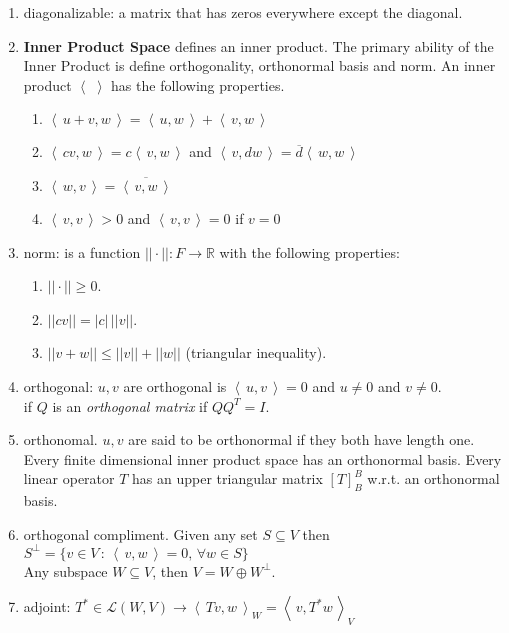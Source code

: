 \documentclass[11pt]{amsart}
\theoremstyle{definition}  %
\newcommand{\R}{\mathbb{R}}
\newcommand{\IP}[1]{\left \langle\, #1 \,\right \rangle}
\newcommand{\LL}{\mathcal{L}}
\begin{document}
\begin{enumerate}
	\item diagonalizable: a matrix that has zeros everywhere except the diagonal.
	\item \textbf{Inner Product Space} defines an inner product.  The primary ability of the Inner Product is define orthogonality, orthonormal basis and norm.  An inner product $\IP{}$ has the following properties.
	\begin{enumerate}[label=\roman*)]
		\item $\IP{u+v,w} = \IP{u,w}+\IP{v,w}$
		\item $\IP{cv,w} = c\IP{v,w}$ and $\IP{v,dw}=\overline{d}\IP{w,w}$
		\item $\IP{w,v} = \overline{\IP{v,w}}$
		\item $\IP{v,v} > 0$ and $\IP{v,v}=0$ if $v=0$
	\end{enumerate}
	\item norm: is a function $||\cdot||: F \to \R$ with the following properties:
	\begin{enumerate}[label=\roman*)]
		\item $||\cdot||\ge 0$.
		\item $||cv||=|c|\, ||v||$.
		\item $||v+w||\le ||v||+||w||$ (triangular inequality).
	\end{enumerate}
	\item orthogonal: $u,v$ are orthogonal is $\IP{u,v}=0$ and $u\ne 0$ and $v \ne 0$.\\
	if $Q$ is an \textit{orthogonal matrix} if $QQ^T=I$.
	\item orthonomal. $u,v$ are said to be orthonormal if they both have length one.\\
		Every finite dimensional inner product space has an orthonormal basis.  Every linear operator $T$ has an upper triangular matrix $[T]_B^B$ w.r.t. an orthonormal basis.
	\item orthogonal compliment.  Given any set $S \subseteq V$ then $S^\perp=\{v \in V\,:\, \IP{v,w}=0,\, \forall w \in S\}$\\
	Any subspace $W \subseteq V$, then $V=W\oplus W^\perp$.
	\item adjoint: $T^* \in \LL(W,V) \to \IP{Tv,w}_W=\IP{v,T^*w}_V$
	

\end{enumerate}
\end{document}
